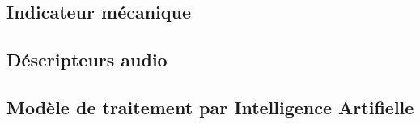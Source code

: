 
\subsection{Indicateur mécanique}


\subsection{Déscripteurs audio}


\subsection{Modèle de traitement par Intelligence Artifielle}